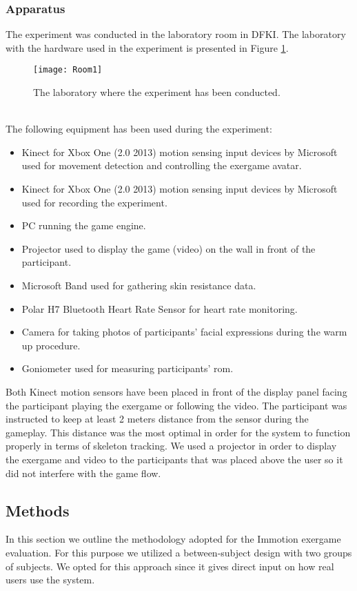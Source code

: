 \subsubsection{Apparatus}
The experiment was conducted in the laboratory room in DFKI. The laboratory with the hardware used in the experiment is presented in Figure \ref{fig:lab1}.\\ 
\begin{figure}[h]
    \centering
    \texttt{[image: Room1]}
    \caption{The laboratory where the experiment has been conducted.}
    \label{fig:lab1}
\end{figure}\\
The following equipment has been used during the experiment:
\begin{itemize}
\item Kinect for Xbox One (2.0 2013) motion sensing input devices by Microsoft used for movement detection and controlling the exergame avatar. 
\item Kinect for Xbox One (2.0 2013) motion sensing input devices by Microsoft used for recording the experiment. 
\item PC running the game engine.
\item Projector used to display the game (video) on the wall in front of the participant.
\item Microsoft Band used for gathering skin resistance data.
\item Polar H7 Bluetooth Heart Rate Sensor for heart rate monitoring.
\item Camera for taking photos of participants' facial expressions during the warm up procedure.
\item Goniometer used for measuring participants' \acrshort{rom}.
\end{itemize}\pagebreak
Both Kinect motion sensors have been placed in front of the display panel facing the participant playing the exergame or following the video. The participant was instructed to keep at least 2 meters distance from the sensor during the gameplay. This distance was the most optimal in order for the system to function properly in terms of skeleton tracking.
We used a projector in order to display the exergame and video to the participants that was placed above the user so it did not interfere with the game flow.
\subsection{Methods} 
In this section we outline the methodology adopted for the Immotion exergame evaluation. For this purpose we utilized a between-subject design with two groups of subjects. We opted for this approach since it gives direct input on how real users use the system.
